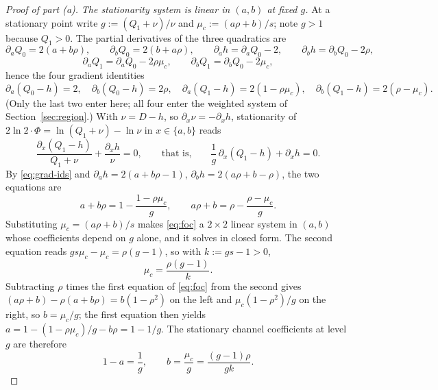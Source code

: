 \documentclass[11pt,onecolumn]{IEEEtran}
\begin{document}
\begin{proof}[Proof of part (a)]
\emph{The stationarity system is linear in $(a,b)$ at fixed $g$.} At a
stationary point write $g:=(Q_1+\nu)/\nu$ and $\mu_c:=(a\rho+b)/s$; note
$g>1$ because $Q_1>0$. The partial derivatives of the three quadratics
are
\[
\partial_aQ_0=2(a+b\rho),\qquad
\partial_bQ_0=2(b+a\rho),\qquad
\partial_ah=\partial_aQ_0-2,\qquad
\partial_bh=\partial_bQ_0-2\rho,
\]
\[
\partial_aQ_1=\partial_aQ_0-2\rho\mu_c,\qquad
\partial_bQ_1=\partial_bQ_0-2\mu_c,
\]
hence the four gradient identities
\begin{equation}
\partial_a(Q_0-h)=2,\quad
\partial_b(Q_0-h)=2\rho,\quad
\partial_a(Q_1-h)=2(1-\rho\mu_c),\quad
\partial_b(Q_1-h)=2(\rho-\mu_c).
\label{eq:grad-ids}
\end{equation}
(Only the last two enter here; all four enter the weighted system of
Section~\ref{sec:region}.) With $\nu=D-h$, so
$\partial_x\nu=-\partial_xh$, stationarity of
$2\ln2\cdot\Phi=\ln(Q_1+\nu)-\ln \nu$ in $x\in\{a,b\}$ reads
\[
\frac{\partial_x(Q_1-h)}{Q_1+\nu}+\frac{\partial_xh}{\nu}=0,
\qquad\text{that is,}\qquad
\frac1g\,\partial_x(Q_1-h)+\partial_xh=0 .
\]
By \eqref{eq:grad-ids} and
$\partial_ah=2(a+b\rho-1)$, $\partial_bh=2(a\rho+b-\rho)$, the two
equations are
\begin{equation}
a+b\rho=1-\frac{1-\rho\mu_c}{g},
\qquad
a\rho+b=\rho-\frac{\rho-\mu_c}{g} .
\label{eq:foc}
\end{equation}
Substituting $\mu_c=(a\rho+b)/s$ makes \eqref{eq:foc} a $2\times2$
linear system in $(a,b)$ whose coefficients depend on $g$ alone, and it
solves in closed form. The second equation reads
$gs\mu_c-\mu_c=\rho(g-1)$, so with $k:=gs-1>0$,
\begin{equation}
\mu_c=\frac{\rho(g-1)}{k} .
\label{eq:mu}
\end{equation}
Subtracting $\rho$ times the first equation of \eqref{eq:foc} from the
second gives
$(a\rho+b)-\rho(a+b\rho)=b(1-\rho^2)$ on the left and
$\mu_c(1-\rho^2)/g$ on the right, so $b=\mu_c/g$; the first equation
then yields $a=1-(1-\rho\mu_c)/g-b\rho=1-1/g$. The stationary channel
coefficients at level $g$ are therefore
\begin{equation}
1-a=\frac1g,
\qquad
b=\frac{\mu_c}{g}=\frac{(g-1)\rho}{gk} .
\label{eq:ab}
\end{equation}


\end{proof}
\end{document}
